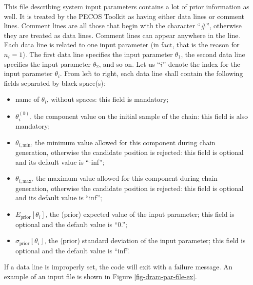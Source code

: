 This file describing system input parameters contains a lot of prior information as well.
It is treated by the PECOS Toolkit as having either data lines or comment lines.
Comment lines are all those that begin with the character ``\#'', otherwise they are treated as data lines.
Comment lines can appear anywhere in the line.
Each data line is related to one input parameter (in fact, that is the reason for $n_i=1$). 
The first data line specifies the input parameter $\theta_1$,
the second data line specifies the input parameter $\theta_2$,
and so on.
Let us ``$i$'' denote the index for the input parameter $\theta_i$.
From left to right, each data line shall contain the following fields separated by black space(s):
\begin{itemize}
\item name of $\theta_i$, without spaces: this field is mandatory;
\item $\theta_i^{(0)}$, the component value on the initial sample of the chain: this field is also mandatory;
\item $\theta_{i,\text{min}}$, the minimum value allowed for this component during chain generation, otherwise the candidate position is rejected: this field is optional and its default value is ``-inf'';
\item $\theta_{i,\text{max}}$, the maximum value allowed for this component during chain generation, otherwise the candidate position is rejected: this field is optional and its default value is ``inf'';
\item $E_{\text{prior}}[\theta_i]$, the (prior) expected value of the input parameter; this field is optional and the default value is ``0.'';
\item $\sigma_{\text{prior}}[\theta_i]$, the (prior) standard deviation of the input parameter; this field is optional and the default value is ``inf''.
\end{itemize}
If a data line is improperly set, the code will exit with a failure message.
An example of an input file is shown in Figure \ref{fig-dram-par-file-ex}.

